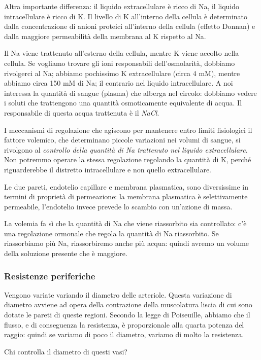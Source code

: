 \documentclass[a4paper,12pt]{article}
\begin{document}
Altra importante differenza: il liquido extracellulare è ricco di Na, il liquido intracellulare è ricco di K. Il livello di K all'interno della cellula è determinato dalla concentrazione di anioni proteici all'interno della cellula (effetto Donnan) e dalla maggiore permeabilità della membrana al K rispetto al Na.

Il Na viene trattenuto all'esterno della cellula, mentre K viene accolto nella cellula. Se vogliamo trovare gli ioni responsabili dell'osmolarità, dobbiamo rivolgerci al Na; abbiamo pochissimo K extracellulare (circa 4 mM), mentre abbiamo circa 150 mM di Na; il contrario nel liquido intracellulare. A noi interessa la quantità di sangue (plasma) che alberga nel circolo: dobbiamo vedere i soluti che trattengono una quantità osmoticamente equivalente di acqua. Il responsabile di questa acqua trattenuta è il \emph{NaCl}. 

I meccanismi di regolazione che agiscono per mantenere entro limiti fisiologici il fattore volemico, che determinano piccole variazioni nei volumi di sangue, si rivolgono al \emph{controllo della quantità di Na trattenuto nel liquido extracellulare}. Non potremmo operare la stessa regolazione regolando la quantità di K, perché riguarderebbe il distretto intracellulare e non quello extracellulare. 

Le due pareti, endotelio capillare e membrana plasmatica, sono diversissime in termini di proprietà di permeazione: la membrana plasmatica è selettivamente permeabile, l'endotelio invece prevede lo scambio con un'azione di massa.

La volemia fa sì che la quantità di Na che viene riassorbito sia controllato: c'è una regolazione ormonale che regola la quantità di Na riassorbito. Se riassorbiamo più Na, riassorbiremo anche più acqua: quindi avremo un volume della soluzione presente che è maggiore.

\subsubsection{Resistenze periferiche}
Vengono variate variando il diametro delle arteriole. Questa variazione di diametro avviene ad opera della contrazione della muscolatura liscia di cui sono dotate le pareti di queste regioni. Secondo la legge di Poiseuille, abbiamo che il flusso, e di conseguenza la resistenza, è proporzionale alla quarta potenza del raggio: quindi se variamo di poco il diametro, variamo di molto la resistenza.

Chi controlla il diametro di questi vasi?
\end{document}
